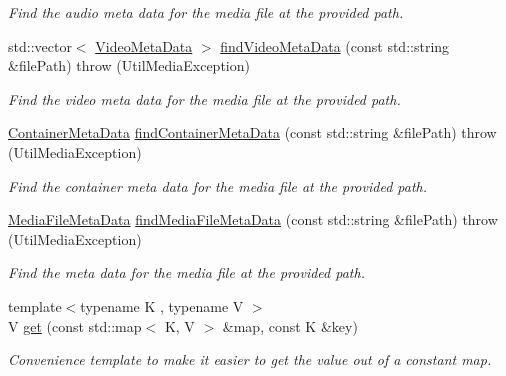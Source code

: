 \begin{DoxyCompactItemize}
\begin{DoxyCompactList}\small\item\em Find the audio meta data for the media file at the provided path. \item\end{DoxyCompactList}\item 
std::vector$<$ \hyperlink{structtranscode_1_1VideoMetaData}{VideoMetaData} $>$ \hyperlink{namespacetranscode_1_1util_a50b2171ced48530874981579e184cd2f}{findVideoMetaData} (const std::string \&filePath)  throw (UtilMediaException)
\begin{DoxyCompactList}\small\item\em Find the video meta data for the media file at the provided path. \item\end{DoxyCompactList}\item 
\hyperlink{structtranscode_1_1ContainerMetaData}{ContainerMetaData} \hyperlink{namespacetranscode_1_1util_aca52b690775495a84c8f13094d2de8bf}{findContainerMetaData} (const std::string \&filePath)  throw (UtilMediaException)
\begin{DoxyCompactList}\small\item\em Find the container meta data for the media file at the provided path. \item\end{DoxyCompactList}\item 
\hyperlink{structtranscode_1_1MediaFileMetaData}{MediaFileMetaData} \hyperlink{namespacetranscode_1_1util_a66d32ba3f1d1db41872f86838109695b}{findMediaFileMetaData} (const std::string \&filePath)  throw (UtilMediaException)
\begin{DoxyCompactList}\small\item\em Find the meta data for the media file at the provided path. \item\end{DoxyCompactList}\item 
{\footnotesize template$<$typename K , typename V $>$ }\\V \hyperlink{namespacetranscode_1_1util_a250303dbe84b229a60d951d9004d4464}{get} (const std::map$<$ K, V $>$ \&map, const K \&key)
\begin{DoxyCompactList}\small\item\em Convenience template to make it easier to get the value out of a constant map. \item\end{DoxyCompactList}\end{DoxyCompactItemize}

